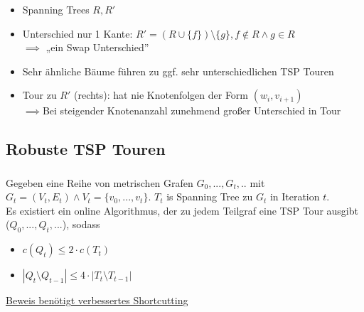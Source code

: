 \begin{frame}
    \frametitle{\insertsubsection}
    \begin{itemize}
        \itemsep\setlength{0.7em}
        \item Spanning Trees $R, R'$
        \item Unterschied nur 1 Kante: $R' = (R \cup \{f\}) \setminus \{g\}, f \notin R \wedge g \in R$\\$\implies$ „ein Swap Unterschied”
        \vspace{1em}
        \item Sehr ähnliche Bäume führen zu ggf. sehr unterschiedlichen TSP Touren
        \item Tour zu $R'$ (rechts): hat nie Knotenfolgen der Form $(w_i, v_{i+1})$\\$\implies$Bei steigender Knotenanzahl zunehmend großer Unterschied in Tour
    \end{itemize}
\end{frame}

\subsection{Robuste TSP Touren}

\begin{frame}
    \frametitle{\insertsubsection}
    \begin{theorem}
        \vspace{.8em}
        Gegeben eine Reihe von metrischen Grafen $G_0, ..., G_t,..$ mit $G_t = (V_t, E_t) \wedge V_t = \{v_0, ...,v_t\}$. $T_t$ is Spanning Tree zu $G_t$ in Iteration $t$.\\
        \vspace{1em}
        Es existiert ein online Algorithmus, der zu jedem Teilgraf eine TSP Tour ausgibt ($Q_0, ..., Q_t, ...$), sodass
        \vspace{.7em}
        \begin{itemize}
            \itemsep\setlength{0.7em}
            \item $c(Q_t) \leq 2 \cdot c(T_t)$
            \item $|Q_t \setminus Q_{t-1}| \leq 4 \cdot |T_t \setminus T_{t-1}|$
        \end{itemize}
        \vspace{.8em}
    \end{theorem}
    \vspace{1em}
    \underline{Beweis benötigt verbessertes Shortcutting}
\end{frame}